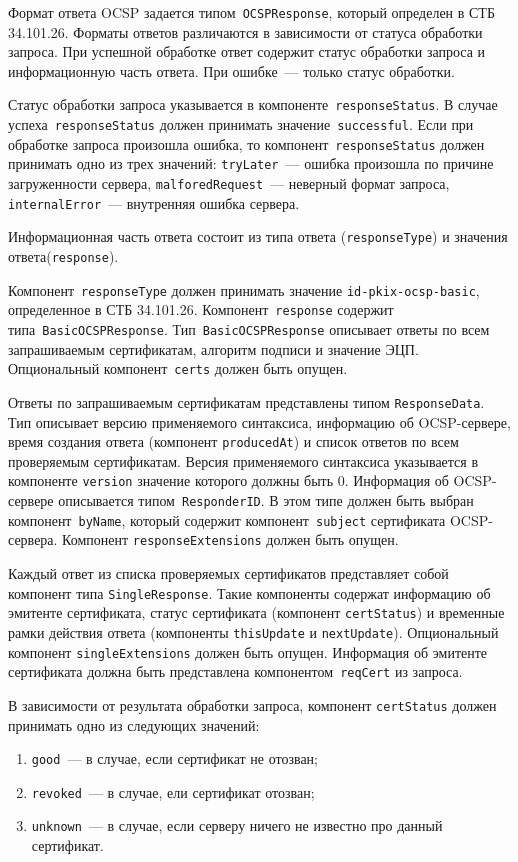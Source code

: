 Формат ответа OCSP задается типом~\texttt{OCSPResponse}, который определен 
в СТБ 34.101.26.  Форматы ответов различаются в зависимости от статуса 
обработки запроса. При успешной обработке ответ содержит статус обработки 
запроса и информационную часть ответа. При ошибке~--- только статус обработки.

Статус обработки запроса указывается в компоненте~\texttt{responseStatus}.
%
В случае успеха~\texttt{responseStatus} должен принимать значение~\texttt{successful}.
%
Если при обработке запроса произошла ошибка, то 
компонент~\texttt{responseStatus} должен принимать одно из трех значений: 
\texttt{tryLater}~--- ошибка произошла по причине загруженности сервера, 
\texttt{malforedRequest}~--- неверный формат запроса, 
\texttt{internalError}~--- внутренняя ошибка сервера.

Информационная часть ответа состоит из типа ответа
(\texttt{responseType}) и значения ответа(\texttt{response}).
 
Компонент~\texttt{responseType} должен принимать значение
\texttt{id-pkix-ocsp-basic}, определенное в СТБ 34.101.26. 
Компонент~\texttt{response} содержит  
типа~\texttt{BasicOCSPResponse}. Тип~\texttt{BasicOCSPResponse} описывает 
ответы по всем запрашиваемым сертификатам, алгоритм подписи и значение  
ЭЦП. Опциональный компонент~\texttt{certs} должен быть опущен.

Ответы по запрашиваемым сертификатам представлены типом 
\texttt{ResponseData}. Тип описывает версию применяемого синтаксиса, 
информацию об OCSP-сервере, время создания ответа (компонент 
\texttt{producedAt}) и список ответов по всем проверяемым сертификатам. 
Версия применяемого синтаксиса указывается в компоненте
\texttt{version} значение которого должны быть $0$. 
Информация об OCSP-сервере описывается типом~\texttt{ResponderID}.
В этом типе должен быть выбран компонент~\texttt{byName},
который содержит компонент~\texttt{subject} 
сертификата OCSP-сервера. Компонент \texttt{responseExtensions} должен быть опущен.

Каждый ответ из списка проверяемых сертификатов представляет собой
компонент типа \texttt{SingleResponse}. Такие компоненты содержат
информацию об эмитенте сертификата, статус сертификата (компонент
\texttt{certStatus}) и временные рамки действия ответа (компоненты
\texttt{thisUpdate} и \texttt{nextUpdate}). Опциональный компонент
\texttt{singleExtensions} должен быть опущен. Информация об эмитенте
сертификата должна быть представлена компонентом~\texttt{reqCert} из
запроса.

В зависимости от результата обработки запроса, компонент 
\texttt{certStatus} должен принимать одно из следующих значений: 
\begin{enumerate}
\item \texttt{good}~--- в случае, если сертификат не отозван;
\item \texttt{revoked}~--- в случае, ели сертификат отозван;
\item \texttt{unknown}~--- в случае, если серверу ничего не известно про 
данный сертификат. 
\end{enumerate}
 

